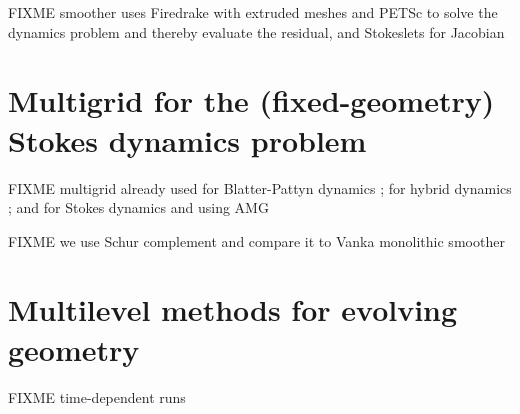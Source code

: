 \documentclass[letterpaper,final,12pt,reqno]{amsart}
\theoremstyle{claim}
\numberwithin{equation}{section}
\numberwithin{figure}{section}
\numberwithin{table}{section}
\numberwithin{theorem}{section}
\begin{document}
FIXME smoother uses Firedrake \cite{Alnaesetal2014,Rathgeberetal2016} with extruded meshes \cite{Gibsonetal2019,McRaeetal2016} and PETSc \cite{Balayetal2020,Bueler2021} to solve the dynamics problem and thereby evaluate the residual, and Stokeslets for Jacobian

\section{Multigrid for the (fixed-geometry) Stokes dynamics problem} \label{sec:stokesdynamics}

FIXME multigrid already used for Blatter-Pattyn dynamics \cite{BrownSmithAhmadia2013}; for hybrid dynamics \cite{Jouvetetal2013,JouvetGraeser2013}; and for Stokes dynamics \cite{IsaacStadlerGhattas2015} and \cite{Tuminaroetal2016} using AMG

FIXME we use Schur complement \cite{Bueler2021,Elmanetal2014} and compare it to Vanka monolithic smoother \cite{Farrelletal2019}

\section{Multilevel methods for evolving geometry} \label{sec:stokesevolution}

FIXME time-dependent runs

\small

\bigskip


\end{document}
